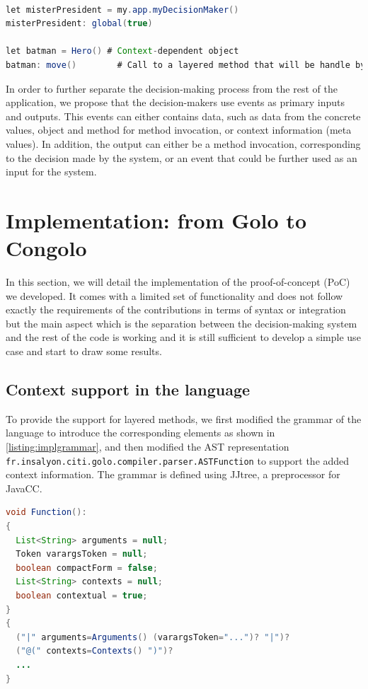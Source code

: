 \documentclass[a4paper]{article}
\begin{document}
\begin{lstlisting}[float, language=Java, caption=Congolo example, label={listing:congolohero}]

let misterPresident = my.app.myDecisionMaker()
misterPresident: global(true)

let batman = Hero() # Context-dependent object
batman: move()        # Call to a layered method that will be handle by one of the global decision-maker

\end{lstlisting}

In order to further separate the decision-making process from the rest of the application, we propose that the decision-makers use events as primary inputs and outputs. This events can either contains data, such as data from the concrete values, object and method for method invocation, or context information (meta values). In addition, the output can either be a method invocation, corresponding to the decision made by the system, or an event that could be further used as an input for the system.

\section{Implementation: from Golo to Congolo}
\label{section:implementation}
In this section, we will detail the implementation of the proof-of-concept (PoC) we developed. It comes with a limited set of functionality and does not follow exactly the requirements of the contributions in terms of syntax or integration but the main aspect which is the separation between the decision-making system and the rest of the code is working and it is still sufficient to develop a simple use case and start to draw some results. 

\subsection{Context support in the language}
To provide the support for layered methods, we first modified the grammar of the language to introduce the corresponding elements as shown in \ref{listing:implgrammar}, and then modified the AST representation \lstinline|fr.insalyon.citi.golo.compiler.parser.ASTFunction| to support the added context information. The grammar is defined using JJtree, a preprocessor for JavaCC.

\begin{lstlisting}[float, language=Java, caption=Grammar modification - Golo.jjt, label={listing:implgrammar}]
void Function():
{
  List<String> arguments = null;
  Token varargsToken = null;
  boolean compactForm = false;
  List<String> contexts = null;
  boolean contextual = true;
}
{
  ("|" arguments=Arguments() (varargsToken="...")? "|")?
  ("@(" contexts=Contexts() ")")?
  ...
}
\end{lstlisting}
\end{document}
